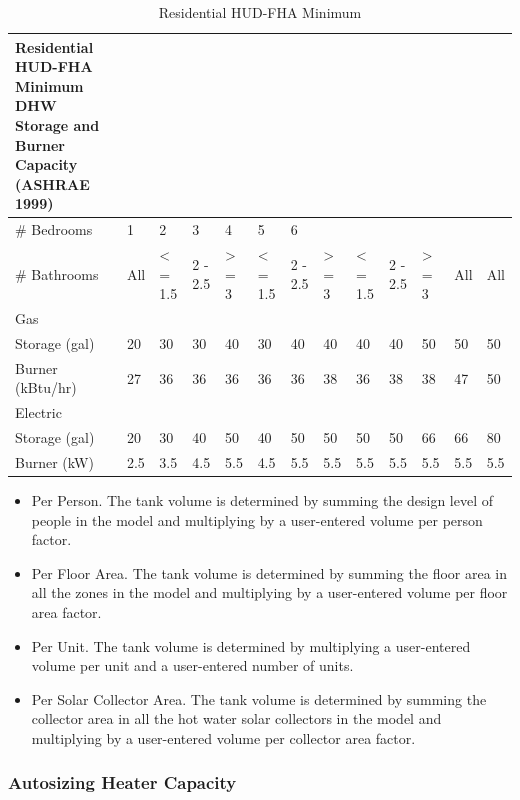 \begin{longtable}[c]{p{0.46in}p{0.46in}p{0.46in}p{0.46in}p{0.46in}p{0.46in}p{0.46in}p{0.46in}p{0.46in}p{0.46in}p{0.46in}p{0.46in}p{0.46in}}
\caption{Residential HUD-FHA Minimum \protect \label{table:residential-hud-fha-minimum}}\\
\toprule 
Residential HUD-FHA Minimum DHW Storage and Burner Capacity (ASHRAE 1999) \tabularnewline \midrule
\endhead
\# Bedrooms & 1 & 2 & 3 & 4 & 5 & 6 \tabularnewline
\# Bathrooms & All & <  = 1.5 & 2 - 2.5 & >  = 3 & <  = 1.5 & 2 - 2.5 & >  = 3 & <  = 1.5 & 2 - 2.5 & >  = 3 & All & All \tabularnewline
Gas &  &  &  &  &  &  &  &  &  &  &  &  \tabularnewline
Storage (gal) & 20 & 30 & 30 & 40 & 30 & 40 & 40 & 40 & 40 & 50 & 50 & 50 \tabularnewline
Burner (kBtu/hr) & 27 & 36 & 36 & 36 & 36 & 36 & 38 & 36 & 38 & 38 & 47 & 50 \tabularnewline
Electric &  &  &  &  &  &  &  &  &  &  &  &  \tabularnewline
Storage (gal) & 20 & 30 & 40 & 50 & 40 & 50 & 50 & 50 & 50 & 66 & 66 & 80 \tabularnewline
Burner (kW) & 2.5 & 3.5 & 4.5 & 5.5 & 4.5 & 5.5 & 5.5 & 5.5 & 5.5 & 5.5 & 5.5 & 5.5 \tabularnewline
\bottomrule
\end{longtable}

\begin{itemize}
  \item Per Person. The tank volume is determined by summing the design level of people in the model and multiplying by a user-entered volume per person factor.

  \item Per Floor Area. The tank volume is determined by summing the floor area in all the zones in the model and multiplying by a user-entered volume per floor area factor.

  \item Per Unit. The tank volume is determined by multiplying a user-entered volume per unit and a user-entered number of units.

  \item Per Solar Collector Area. The tank volume is determined by summing the collector area in all the hot water solar collectors in the model and multiplying by a user-entered volume per collector area factor.
\end{itemize}

\subsubsection{Autosizing Heater Capacity}\label{autosizing-heater-capacity}

